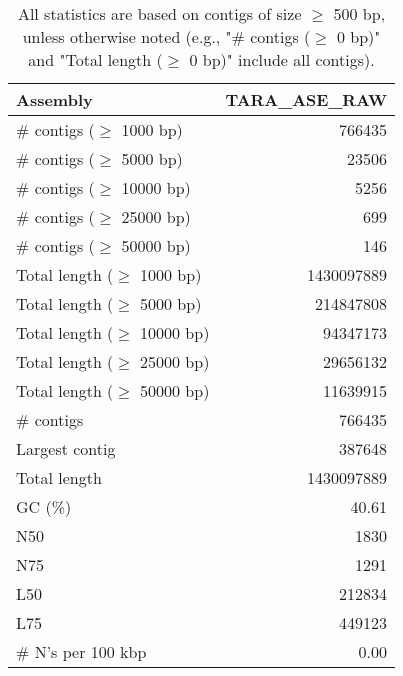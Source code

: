 \documentclass[12pt,a4paper]{article}
\begin{document}
\begin{table}[ht]
\begin{center}
\caption{All statistics are based on contigs of size $\geq$ 500 bp, unless otherwise noted (e.g., "\# contigs ($\geq$ 0 bp)" and "Total length ($\geq$ 0 bp)" include all contigs).}
\begin{tabular}{|l*{1}{|r}|}
\hline
Assembly & TARA\_ASE\_RAW \\ \hline
\# contigs ($\geq$ 1000 bp) & 766435 \\ \hline
\# contigs ($\geq$ 5000 bp) & 23506 \\ \hline
\# contigs ($\geq$ 10000 bp) & 5256 \\ \hline
\# contigs ($\geq$ 25000 bp) & 699 \\ \hline
\# contigs ($\geq$ 50000 bp) & 146 \\ \hline
Total length ($\geq$ 1000 bp) & 1430097889 \\ \hline
Total length ($\geq$ 5000 bp) & 214847808 \\ \hline
Total length ($\geq$ 10000 bp) & 94347173 \\ \hline
Total length ($\geq$ 25000 bp) & 29656132 \\ \hline
Total length ($\geq$ 50000 bp) & 11639915 \\ \hline
\# contigs & 766435 \\ \hline
Largest contig & 387648 \\ \hline
Total length & 1430097889 \\ \hline
GC (\%) & 40.61 \\ \hline
N50 & 1830 \\ \hline
N75 & 1291 \\ \hline
L50 & 212834 \\ \hline
L75 & 449123 \\ \hline
\# N's per 100 kbp & 0.00 \\ \hline
\end{tabular}
\end{center}
\end{table}
\end{document}
